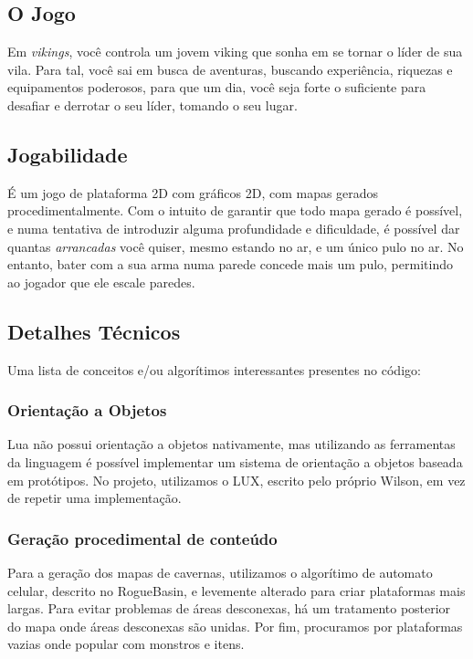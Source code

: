 
  \subsection{O Jogo}
    Em \textit{vikings}, você controla um jovem viking que sonha em se tornar o líder de sua vila. Para tal,
    você sai em busca de aventuras, buscando experiência, riquezas e equipamentos poderosos, para que um dia,
    você seja forte o suficiente para desafiar e derrotar o seu líder, tomando o seu lugar.
        
  \subsection{Jogabilidade}
    É um jogo de plataforma 2D com gráficos 2D, com mapas gerados procedimentalmente. Com o intuito de garantir
    que todo mapa gerado é possível, e numa tentativa de introduzir alguma profundidade e dificuldade, é
    possível dar quantas \textit{arrancadas} você quiser, mesmo estando no ar, e um único pulo no ar. No
    entanto, bater com a sua arma numa parede concede mais um pulo, permitindo ao jogador que ele escale
    paredes.
    
  \subsection{Detalhes Técnicos}
    Uma lista de conceitos e/ou algorítimos interessantes presentes no código:
    
    \subsubsection{Orientação a Objetos}
      Lua não possui orientação a objetos nativamente, mas utilizando as ferramentas da linguagem é possível
      implementar um sistema de orientação a objetos baseada em protótipos.
      No projeto, utilizamos o LUX\footnotemark{}, escrito pelo próprio Wilson, em vez de repetir uma implementação.
      
    
    \subsubsection{Geração procedimental de conteúdo}
      Para a geração dos mapas de cavernas, utilizamos o algorítimo de automato celular, descrito no RogueBasin,
      \cite{roguebasin:cellularautomata} e levemente alterado para criar plataformas mais largas. Para
      evitar problemas de áreas desconexas, há um tratamento posterior do mapa onde áreas desconexas são unidas.
      Por fim, procuramos por plataformas vazias onde popular com monstros e itens.